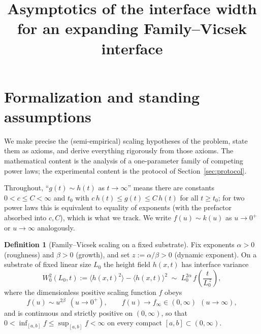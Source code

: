 \documentclass{amsart}
\theoremstyle{definition}
\newtheorem{definition}{Definition}
\newcommand{\asymp}{\sim}
\begin{document}
\title{Asymptotics of the interface width for an expanding Family--Vicsek interface}
\author{}
\date{}
\maketitle

\section{Formalization and standing assumptions}

We make precise the (semi-empirical) scaling hypotheses of the problem, state them
as axioms, and derive everything rigorously from those axioms. The mathematical
content is the analysis of a one-parameter family of competing power laws; the
experimental content is the protocol of Section~\ref{sec:protocol}.

Throughout, ``$g(t)\asymp h(t)$ as $t\to\infty$'' means there are constants
$0<c\le C<\infty$ and $t_0$ with $c\,h(t)\le g(t)\le C\,h(t)$ for all $t\ge t_0$;
for two power laws this is equivalent to equality of exponents (with the prefactor
absorbed into $c,C$), which is what we track. We write $f(u)\asymp k(u)$ as
$u\to0^+$ or $u\to\infty$ analogously.

\begin{definition}[Family--Vicsek scaling on a fixed substrate]\label{def:FV}
Fix exponents $\alpha>0$ (roughness) and $\beta>0$ (growth), and set
$z:=\alpha/\beta>0$ (dynamic exponent). On a substrate of fixed linear size
$L_0$ the height field $h(x,t)$ has interface variance
\begin{equation}\label{eq:FV}
  W_0^2(L_0,t):=\langle h(x,t)^2\rangle-\langle h(x,t)\rangle^2
  \;\asymp\; L_0^{2\alpha}\, f\!\left(\frac{t}{L_0^{\,z}}\right),
\end{equation}
where the dimensionless positive scaling function $f$ obeys
\begin{equation}\label{eq:fasymp}
  f(u)\asymp u^{2\beta}\ \ (u\to 0^+),\qquad
  f(u)\to f_\infty\in(0,\infty)\ \ (u\to\infty),
\end{equation}
and is continuous and strictly positive on $(0,\infty)$, so that
$0<\inf_{[a,b]}f\le\sup_{[a,b]}f<\infty$ on every compact $[a,b]\subset(0,\infty)$.
\end{definition}
\end{document}
